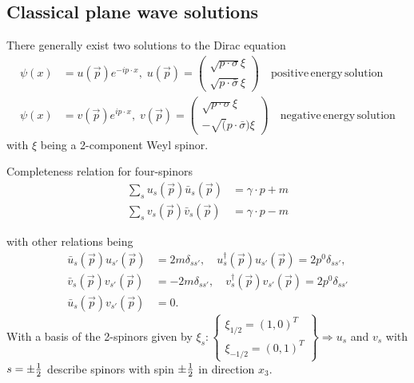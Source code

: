\subsection{Classical plane wave solutions}
There generally exist two solutions to the Dirac equation
\begin{align}
	\psi(x) &= u(\vec{p}) e^{- i p \cdot x}, \; u(\vec{p})= \begin{pmatrix}
		\sqrt{p \cdot \sigma} \xi \\
		\sqrt{p \cdot \bar{\sigma}} \xi 
	\end{pmatrix} 
\quad \mathrm{positive \, energy \, solution}\\
\psi(x) &= v(\vec{p}) e^{i p\cdot x}, \; v(\vec{p}) = \begin{pmatrix}
	\sqrt{p\cdot \sigma} \xi \\
	- \sqrt(p\cdot \bar{\sigma}) \xi
\end{pmatrix}
\quad 
\mathrm{negative\, energy\, solution}
\end{align}
with $\xi$ being a 2-component Weyl spinor.

\begin{mybox}{Completeness relation for four-spinors}
	\begin{align}
		\sum_s  u_s(\vec{p}) \bar{u}_s(\vec{p}) &= \gamma \cdot p+m\\
		\sum_s v_s(\vec{p}) \bar{v}_s(\vec{p}) &= \gamma \cdot p -m 
	\end{align}
\end{mybox}
with other relations being
\begin{align*}
	\bar{u}_s(\vec{p}) u_{s'}(\vec{p}) &= 2 m \delta_{s s'}, \quad u^{\dagger}_s(\vec{p})u_{s' }(\vec{p}) = 2 p^0 \delta_{s s'}, \\
	\bar{v}_s(\vec{p})v_{s'}(\vec{p}) &=-2 m \delta_{s s'},\quad v^{\dagger}_s(\vec{p}) v_{s'}(\vec{p}) = 2p^0 \delta_{s s'}\\
	\bar{u}_s(\vec{p}) v_{s'}(\vec{p}) &=0.
\end{align*}
With a basis of the 2-spinors given by $\xi_s: \left\{ \begin{array}{lr}
	\xi_{1/2} =(1,0)^T\\
	\xi_{-1 /2} = (0,1)^T
\end{array}	\right\} \Rightarrow u_s$ and $v_s$ with $s = \pm \frac{1}{2}$ describe spinors with spin $\pm \frac{1}{2}$ in direction $x_3$.

